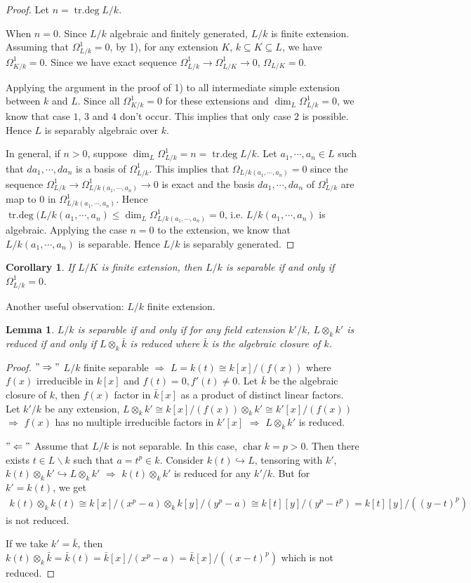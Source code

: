 \documentclass[cs4size]{article}
\newcommand{\de}{\backslash}
\newcommand{\su}{\subseteq}
\newcommand{\ra}{\rightarrow}
\newcommand{\Ra}{\Rightarrow}
\DeclareMathOperator{\chara}{char}
\DeclareMathOperator{\trdeg}{tr.deg}
\newtheorem{lem}{Lemma}
\newtheorem{cor}{Corollary}
\begin{document}
\begin{proof}
Let $n=\trdeg L/k$.

When $n=0$. Since $L/k$ algebraic and finitely generated, $L/k$ is finite extension. Assuming that $\Omega_{L/k}^1=0$, by 1), for any extension $K$, $k\su K\su L$, we have $\Omega_{K/k}^1=0$. Since we have exact sequence $\Omega_{L/k}^1\ra\Omega_{L/K}^1\ra0$, $\Omega_{L/K}=0$.

Applying the argument in the proof of 1) to all intermediate simple extension between $k$ and $L$. Since all $\Omega_{K/k}^1=0$ for these extensions and $\dim_L\Omega_{L/k}^1=0$, we know that case $1$, $3$ and $4$ don't occur. This implies that only case $2$ is possible. Hence $L$ is separably algebraic over $k$.

In general, if $n>0$, suppose $\dim_L\Omega_{L/k}^1=n=\trdeg L/k$. Let $a_1,\cdots,a_n\in L$ such that $da_1,\cdots,da_n$ is a basis of $\Omega_{L/k}^1$. This implies that $\Omega_{L/k(a_1,\cdots,a_n)}=0$ since the sequence $\Omega_{L/k}^1\ra\Omega_{L/k(a_1,\cdots,a_n)}^1\ra 0$ is exact and the basis $da_1,\cdots,da_n$ of $\Omega_{L/k}^1$ are map to $0$ in $\Omega_{L/k(a_1,\cdots,a_n)}^1$. Hence $\trdeg(L/k(a_1,\cdots,a_n)\leq \dim_L\Omega_{L/k(a_1,\cdots,a_n)}^1=0$, i.e. $L/k(a_1,\cdots,a_n)$ is algebraic. Applying the case $n=0$ to the extension, we know that $L/k(a_1,\cdots,a_n)$ is separable. Hence $L/k$ is separably generated.
\end{proof}

\begin{cor}
If $L/K$ is finite extension, then $L/k$ is separable if and only if $\Omega_{L/k}^1=0$.
\end{cor}

Another useful observation: $L/k$ finite extension.
\begin{lem}
$L/k$ is separable if and only if for any field extension $k'/k$, $L\otimes_kk'$ is reduced if and only if $L\otimes_k\bar{k}$ is reduced where $\bar{k}$ is the algebraic closure of $k$.
\end{lem}
\begin{proof}
$"\Ra"$ $L/k$ finite separable $\Ra$ $L=k(t)\cong k[x]/(f(x))$ where $f(x)$ irreducible in $k[x]$ and $f(t)=0,f'(t)\neq 0$. Let $\bar{k}$ be the algebraic closure of $k$, then $f(x)$ factor in $\bar{k}[x]$ as a product of distinct linear factors. Let $k'/k$ be any extension, $L\otimes_kk'\cong k[x]/(f(x))\otimes_kk'\cong k'[x]/(f(x))$ $\Ra$ $f(x)$ has no multiple irreducible factors in $k'[x]$ $\Ra$ $L\otimes_kk'$ is reduced.

$"\Leftarrow"$ Assume that $L/k$ is not separable. In this case, $\chara k=p>0$. Then there exists $t\in L\de k$  such that $a=t^p\in k$. Consider $k(t)\hookrightarrow L$, tensoring with $k'$, $k(t)\otimes_kk'\hookrightarrow L\otimes_kk'$ $\Ra$ $k(t)\otimes_kk'$ is reduced for any $k'/k$. But for $k'=k(t)$, we get
\begin{align*}
k(t)\otimes_kk(t)\cong k[x]/(x^p-a)\otimes_kk[y]/(y^p-a)\cong k[t][y]/(y^p-t^p)=k[t][y]/((y-t)^p)
\end{align*}
is not reduced.

If we take $k'=\bar{k}$, then $k(t)\otimes_k\bar{k}=\bar{k}(t)=\bar{k}[x]/(x^p-a)=\bar{k}[x]/((x-t)^p)$ which is not reduced.
\end{proof}
\end{document}
